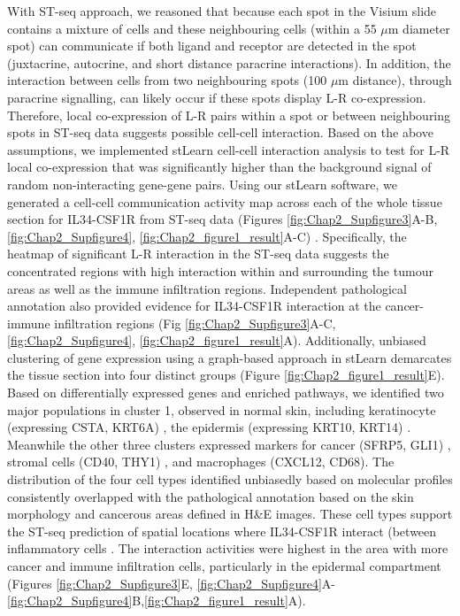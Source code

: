 With ST-seq approach, we reasoned that because each spot in the Visium slide contains a mixture of cells and these neighbouring cells (within a 55 $\mu$m diameter spot) can communicate if both ligand and receptor are detected in the spot (juxtacrine, autocrine, and short distance paracrine interactions). In addition, the interaction between cells from two neighbouring spots (100 $\mu$m distance), through paracrine signalling, can likely occur if these spots display L-R co-expression. Therefore, local co-expression of L-R pairs within a spot or between neighbouring spots in ST-seq data suggests possible cell-cell interaction. Based on the above assumptions, we implemented stLearn cell-cell interaction analysis to test for L-R local co-expression that was significantly higher than the background signal of random non-interacting gene-gene pairs. Using our stLearn software, we generated a cell-cell communication activity map across each of the whole tissue section for IL34-CSF1R from ST-seq data (Figures \ref{fig:Chap2_Supfigure3}A-B, \ref{fig:Chap2_Supfigure4}, \ref{fig:Chap2_figure1_result}A-C) \cite{pham2020stlearn}. Specifically, the heatmap of significant L-R interaction in the ST-seq data suggests the concentrated regions with high interaction within and surrounding the tumour areas as well as the immune infiltration regions. Independent pathological annotation also provided evidence for IL34-CSF1R interaction at the cancer-immune infiltration regions (Fig \ref{fig:Chap2_Supfigure3}A-C, \ref{fig:Chap2_Supfigure4}, \ref{fig:Chap2_figure1_result}A). Additionally, unbiased clustering of gene expression using a graph-based approach in stLearn demarcates the tissue section into four distinct groups (Figure \ref{fig:Chap2_figure1_result}E). Based on differentially expressed genes and enriched pathways, we identified two major populations in cluster 1, observed in normal skin, including keratinocyte (expressing CSTA, KRT6A) \cite{finnegan2019single}, the epidermis (expressing KRT10, KRT14) \cite{ji2020multimodal}. Meanwhile the other three clusters expressed markers for cancer (SFRP5, GLI1) \cite{lacour2002carcinogenesis, ji2020multimodal}, stromal cells (CD40, THY1) \cite{koumas2003thy}, and macrophages (CXCL12, CD68). The distribution of the four cell types identified unbiasedly based on molecular profiles consistently overlapped with the pathological annotation based on the skin morphology and cancerous areas defined in H\&E images. These cell types support the ST-seq prediction of spatial locations where IL34-CSF1R interact (between inflammatory cells \cite{lin2019function}. The interaction activities were highest in the area with more cancer and immune infiltration cells, particularly in the epidermal compartment (Figures \ref{fig:Chap2_Supfigure3}E, \ref{fig:Chap2_Supfigure4}A-\ref{fig:Chap2_Supfigure4}B,\ref{fig:Chap2_figure1_result}A).  
